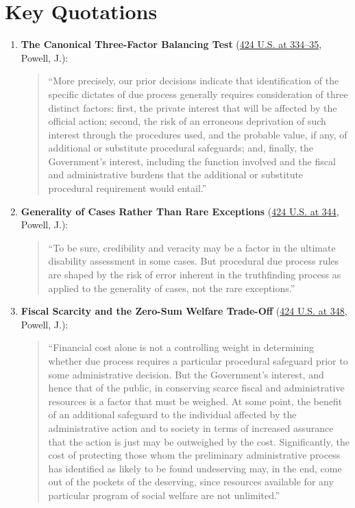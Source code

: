 \documentclass[12pt]{article}
\begin{document}
\section{Key Quotations}

\begin{enumerate}
    \item \textbf{The Canonical Three-Factor Balancing Test} (\href{https://supreme.justia.com/cases/federal/us/424/319/}{424 U.S. at 334--35}, Powell, J.):
    \begin{quote}
    ``More precisely, our prior decisions indicate that identification of the specific dictates of due process generally requires consideration of three distinct factors: first, the private interest that will be affected by the official action; second, the risk of an erroneous deprivation of such interest through the procedures used, and the probable value, if any, of additional or substitute procedural safeguards; and, finally, the Government's interest, including the function involved and the fiscal and administrative burdens that the additional or substitute procedural requirement would entail.''
    \end{quote}

    \item \textbf{Generality of Cases Rather Than Rare Exceptions} (\href{https://supreme.justia.com/cases/federal/us/424/319/}{424 U.S. at 344}, Powell, J.):
    \begin{quote}
    ``To be sure, credibility and veracity may be a factor in the ultimate disability assessment in some cases. But procedural due process rules are shaped by the risk of error inherent in the truthfinding process as applied to the generality of cases, not the rare exceptions.''
    \end{quote}

    \item \textbf{Fiscal Scarcity and the Zero-Sum Welfare Trade-Off} (\href{https://supreme.justia.com/cases/federal/us/424/319/}{424 U.S. at 348}, Powell, J.):
    \begin{quote}
    ``Financial cost alone is not a controlling weight in determining whether due process requires a particular procedural safeguard prior to some administrative decision. But the Government's interest, and hence that of the public, in conserving scarce fiscal and administrative resources is a factor that must be weighed. At some point, the benefit of an additional safeguard to the individual affected by the administrative action and to society in terms of increased assurance that the action is just may be outweighed by the cost. Significantly, the cost of protecting those whom the preliminary administrative process has identified as likely to be found undeserving may, in the end, come out of the pockets of the deserving, since resources available for any particular program of social welfare are not unlimited.''
    \end{quote}


\end{enumerate}
\end{document}
